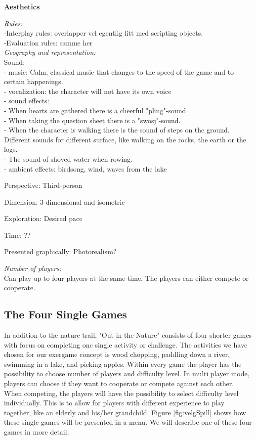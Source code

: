 \textbf{Aesthetics}

\emph{Rules:} \\
-Interplay rules: overlapper vel egentlig litt med scripting objects. \\
-Evaluation rules: samme her \\

\emph{Geography and representation:}\\
Sound: \\
- music: Calm, classical music that changes to the speed of the game and to certain happenings. \\
- vocalization: the character will not have its own voice \\
- sound effects: \\
- When hearts are gathered there is a cheerful "pling"-sound \\
- When taking the question sheet there is a "swosj"-sound. \\
- When the character is walking there is the sound of steps on the ground. Different sounds for different surface, like walking on the rocks, the earth or the logs. \\
- The sound of shoved water when rowing. \\
- ambient effects: birdsong, wind, waves from the lake

Perspective: Third-person

Dimension: 3-dimensional and isometric

Exploration: Desired pace

Time: ??

Presented graphically: Photorealism?

\emph{Number of players:} \\
Can play up to four players at the same time. The players can either compete or cooperate. 


\subsection{The Four Single Games}
In addition to the nature trail, "Out in the Nature" consists of four shorter games with focus on completing one single activity or challenge. The activities we have chosen for our exergame concept is wood chopping, paddling down a river, swimming in a lake, and picking apples. Within every game the player has the possibility to choose number of players and difficulty level. In multi player mode, players can choose if they want to cooperate or compete against each other. When competing, the players will have the possibility to select difficulty level individually. This is to allow for players with different experience to play together, like an elderly and his/her grandchild. Figure \ref{fig:velgSpill} shows how these single games will be presented in a menu. We will describe one of these four games in more detail.

